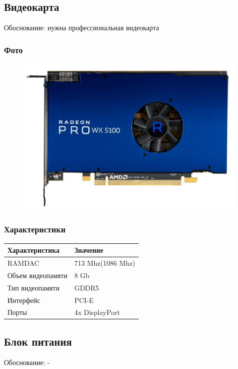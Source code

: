 \documentclass[a4paper]{article}
\begin{document}
\subsection{Видеокарта}
Обоснование: нужна профессиональная видеокарта
\subsubsection{Фото}
\begin{figure}[H]
\centering
\includegraphics[scale=0.3]{gpu.jpg} 
\end{figure}
\subsubsection{Характеристики}
\begin{table}[H]
    \centering
    \begin{tabular}{|l|l|}
    \hline
    Характеристика & Значение \\
    \hline
    RAMDAC & 713 Mhz(1086 Mhz)\\
    Объем видеопамяти & 8 Gb \\
    Тип видеопамяти & GDDR5 \\
    Интерфейс & PCI-E \\
    Порты & 4x DisplayPort \\
    \hline
\end{tabular}
\end{table}

\subsection{Блок питания}
Обоснование: -
\end{document}
